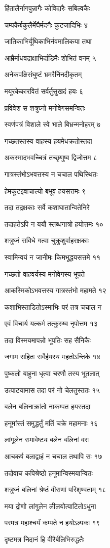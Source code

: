 हिंतालैर्नागपुन्नागैः कोविदारैः सबिल्वकैः

चम्पकैर्बकुलैर्मेघैर्मदनैः कुटजादिभिः ४

जातिकाभिर्यूथिकाभिर्नवमालिकया तथा

आम्रैर्माधवद्राक्षाभिर्दाडिमैः शोभितं वनम् ५

अनेकपक्षिसंघुष्टं भ्रमरैर्निनदीकृतम्

मयूरकेकारवितं सर्वर्तुसुखदं हयः ६

प्रविवेश स शत्रुघ्नो मनोवेगसमन्वितः

स्वर्णपत्रं विशाले स्वे भाले बिभ्रन्मनोहरम् ७

गच्छतस्तस्य वाहस्य हयमेधक्रतोस्तदा

अकस्मादभवच्चित्रं तच्छृणुष्व द्विजोत्तम ८

गात्रस्तंभोऽभवत्तस्य न चचाल पथिस्थितः

हेमकूटइवाचाल्यो बभूव हयसत्तमः ९

तदा तद्रक्षकाः सर्वे कशाघातान्वितेनिरे

तदाहतेऽपि न ययौ स्तब्धगात्रो हयोत्तमः १०

शत्रुघ्नं सविधे गत्वा चुक्रुशुर्वाहरक्षकाः

स्वामिन्वयं न जानीमः किमभूद्धयसत्तमे ११

गच्छतो वाहवर्यस्य मनोवेगस्य भूपते

आकस्मिकोऽभवत्तस्य गात्रस्तंभो महामते १२

कशाभिस्ताडितोऽस्माभिः परं तत्र चचाल न

एवं विचार्य यत्कर्म तत्कुरुष्व नृपोत्तम १३

तदा विस्मयमापन्नो भूपतिः सह सैनिकैः

जगाम सहितः सर्वैर्हयस्य महतोऽन्तिके १४

पुष्कलो बाहुना धृत्वा चरणौ तस्य भूतलात्

उत्पाटयामास तदा परं नो चेलतुस्ततः १५

बलेन बलिनाक्रांतो नाकम्पत हयस्तदा

हनूमांस्तं समुद्धर्तुं मतिं चक्रे महामनाः १६

लांगूलेन समावेष्ट्य बलेन बलिनां वरः

आचकर्ष बलाद्वाहं न चचाल तथापि सः १७

तदोवाच कपिश्रेष्ठो हनूमान्विस्मयान्वितः

शत्रुघ्नं बलिनां श्रेष्ठं वीराणां परिशृण्वताम् १८

मया द्रोणो लांगुलेन लीलयोत्पाटितोऽधुना

परमत्र महाश्चर्यं कम्पते न हयोऽल्पकः १९

दृष्टमत्र निदानं हि वीरैर्बलिभिरुद्धतैः

